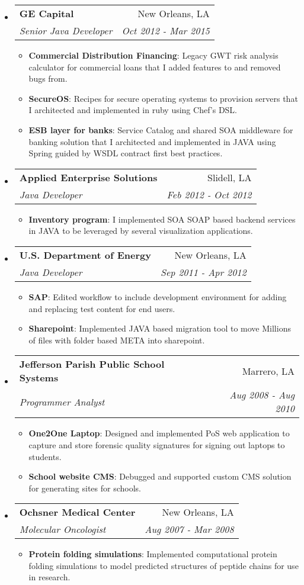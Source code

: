 \documentclass[letterpaper,12pt]{article}
\makeatletter
\newcommand{\resumeItem}[2]{
\item\small{
    \textbf{#1}{: #2 \vspace{-2pt}}
  }
}
\newcommand{\resumeSubheading}[4]{
  \vspace{-1pt}\item{
    \begin{tabular*}{0.97\textwidth}{l@{\extracolsep{\fill}}r}
      \textbf{#1} & #2 \\
      \textit{\small#3} & \textit{\small #4} \\
    \end{tabular*}\vspace{-5pt}}
}
\newcommand{\resumeSubHeadingListStart}{\begin{itemize}[leftmargin=*]}
\newcommand{\resumeSubHeadingListEnd}{\end{itemize}}
\newcommand{\resumeItemListStart}{\justify\begin{itemize}}
\newcommand{\resumeItemListEnd}{\end{itemize}\vspace{-5pt}}
\makeatother
\begin{document}
\resumeSubHeadingListStart
\resumeSubheading
{GE Capital}{New Orleans, LA}
{Senior Java Developer}{Oct 2012 - Mar 2015}
\resumeItemListStart
\resumeItem{Commercial Distribution Financing}
{Legacy GWT risk analysis calculator for commercial loans that I added features to and removed bugs from.}

\resumeItem{SecureOS}
{Recipes for secure operating systems to provision servers that I architected and implemented in ruby using Chef's DSL.}

\resumeItem{ESB layer for banks}
{Service Catalog and shared SOA middleware for banking solution that I architected and implemented in JAVA using Spring guided by WSDL contract first best practices.}  
\resumeItemListEnd
\resumeSubHeadingListEnd

\resumeSubHeadingListStart
\resumeSubheading
{Applied Enterprise Solutions}{Slidell, LA}
{Java Developer}{Feb 2012 - Oct 2012}
\resumeItemListStart
\resumeItem{Inventory program}
{I implemented SOA SOAP based backend services in JAVA to be leveraged by several visualization applications.}
\resumeItemListEnd
\resumeSubHeadingListEnd

\resumeSubHeadingListStart
\resumeSubheading
{U.S. Department of Energy}{New Orleans, LA}    
{Java Developer}{Sep 2011 - Apr 2012}
\resumeItemListStart
\resumeItem{SAP}
{Edited workflow to include development environment for adding and replacing test content for end users.}
\resumeItem{Sharepoint}
{Implemented JAVA based migration tool to move Millions of files with folder based META into sharepoint.}
\resumeItemListEnd
\resumeSubHeadingListEnd

\resumeSubHeadingListStart
\resumeSubheading
{Jefferson Parish Public School Systems}{Marrero, LA}    
{Programmer Analyst}{Aug 2008 - Aug 2010}
\resumeItemListStart
\resumeItem{One2One Laptop}
{Designed and implemented PoS web application to capture and store forensic quality signatures for signing out laptops to students.}
\resumeItem{School website CMS}
{Debugged and supported custom CMS solution for generating sites for schools.}
\resumeItemListEnd
\resumeSubHeadingListEnd

\resumeSubHeadingListStart
\resumeSubheading
{Ochsner Medical Center}{New Orleans, LA}    
{Molecular Oncologist}{Aug 2007 - Mar 2008}
\resumeItemListStart
\resumeItem{Protein folding simulations}
{Implemented computational protein folding simulations to model predicted structures of peptide chains for use in research.}
\resumeItemListEnd
\resumeSubHeadingListEnd
\end{document}
